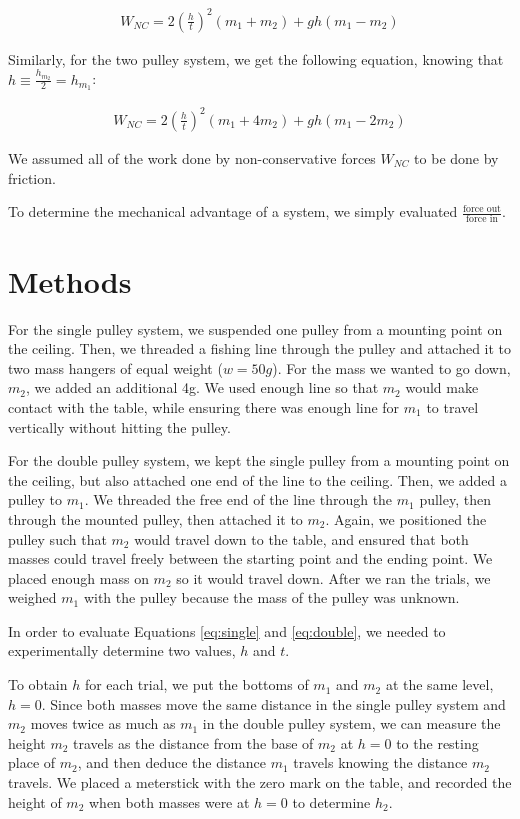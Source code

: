 \documentclass[12pt]{article}
\begin{document}
\begin{align}\label{eq:single}
W_{NC} = 2 \left( \frac{h}{t} \right)^2 (m_1 + m_2) + g h (m_1 - m_2)
\end{align}

Similarly, for the two pulley system, we get the following equation, knowing that \(h \equiv \frac{h_{m_2}}{2} = h_{m_1}\):

\begin{align}\label{eq:double}
W_{NC} = 2 \left( \frac{h}{t} \right)^2 (m_1 + 4 m_2) + g h (m_1 - 2 m_2)
\end{align}

We assumed all of the work done by non-conservative forces \(W_{NC}\) to be done by friction.

To determine the mechanical advantage of a system, we simply evaluated \(\frac{\text{force out}}{\text{force in}}\).
\section{Methods}
\label{sec:org4ee3396}

For the single pulley system, we suspended one pulley from a mounting point on the ceiling. Then, we threaded a fishing line through the pulley and attached it to two mass hangers of equal weight (\(w = 50g\)). For the mass we wanted to go down, \(m_2\), we added an additional 4g. We used enough line so that \(m_2\) would make contact with the table, while ensuring there was enough line for \(m_1\) to travel vertically without hitting the pulley.

For the double pulley system, we kept the single pulley from a mounting point on the ceiling, but also attached one end of the line to the ceiling. Then, we added a pulley to \(m_1\). We threaded the free end of the line through the \(m_1\) pulley, then through the mounted pulley, then attached it to \(m_2\). Again, we positioned the pulley such that \(m_2\) would travel down to the table, and ensured that both masses could travel freely between the starting point and the ending point. We placed enough mass on \(m_2\) so it would travel down. After we ran the trials, we weighed \(m_1\) with the pulley because the mass of the pulley was unknown.

In order to evaluate Equations \ref{eq:single} and \ref{eq:double}, we needed to experimentally determine two values, \(h\) and \(t\).

To obtain \(h\) for each trial, we put the bottoms of \(m_1\) and \(m_2\) at the same level, \(h = 0\). Since both masses move the same distance in the single pulley system and \(m_2\) moves twice as much as \(m_1\) in the double pulley system, we can measure the height \(m_2\) travels as the distance from the base of \(m_2\) at \(h = 0\) to the resting place of \(m_2\), and then deduce the distance \(m_1\) travels knowing the distance \(m_2\) travels. We placed a meterstick with the zero mark on the table, and recorded the height of \(m_2\) when both masses were at \(h = 0\) to determine \(h_2\).
\end{document}
